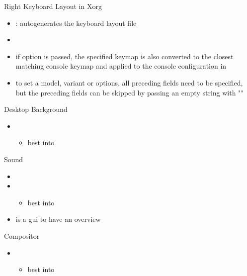 \begin{frame}{Right Keyboard Layout in Xorg\vspace{0.5cm}}
\begin{itemize}
    \begin{itemize}
      \item {}: autogenerates the keyboard layout file
      \item {\tiny {}}
      \item if  option is passed, the specified keymap is also converted to the closest matching console keymap and applied to the console configuration in 
      \item to set a model, variant or options, all preceding fields need to be specified, but the preceding fields can be skipped by passing an empty string with ""
    \end{itemize}
  \end{itemize}
\end{frame}

\begin{frame}[fragile]{Desktop Background}
  \begin{itemize}
    \item {\tiny {}}
    \begin{itemize}
      \item best into 
    \end{itemize}
  \end{itemize}
\end{frame}

\begin{frame}[fragile]{Sound}
  \begin{itemize}
    \item {}
    \item {}
    \begin{itemize}
      \item best into 
    \end{itemize}
    \item {} is a gui to have an overview
  \end{itemize}
\end{frame}

\begin{frame}[fragile]{Compositor}
  \begin{itemize}
    \item {}
      \begin{itemize}
        \item best into 
      \end{itemize}
  \end{itemize}
\end{frame}

